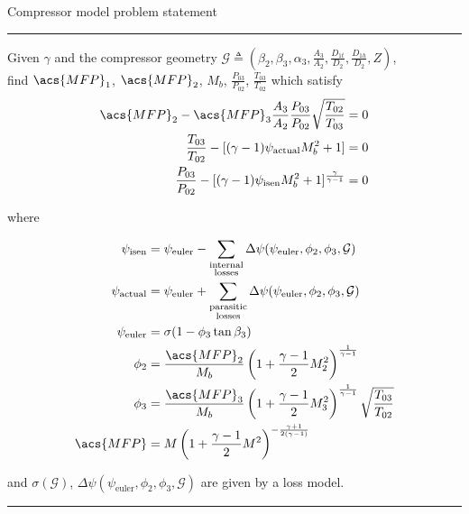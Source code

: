 \documentclass[tcc]{subfiles}
\begin{document}
\begin{table}
\centering
    \caption{Compressor model problem statement}
\begin{minipage}{0.7\textwidth}
    \hrule

    Given $\gamma$ and the compressor geometry 
    $\mathcal{G} \triangleq \left(
    \beta_2, \beta_3, \alpha_3, \tfrac{A_3}{A_2}, \tfrac{D_{1t}}{D_2}, \tfrac{D_{1h}}{D_2}, Z 
    \right)$, \\
    find $\acs{MFP}_1$, $\acs{MFP}_2$, $M_b$, $\frac{P_{03}}{P_{02}}$, $\frac{T_{03}}{T_{02}}$ 
    which satisfy
\begin{align}
    \acs{MFP}_2 - \acs{MFP}_3\frac{A_3}{A_2}\frac{P_{03}}{P_{02}}\sqrt{\frac{T_{02}}{T_{03}}}    &= 0 \\
    \frac{T_{03}}{T_{02}} - [(\gamma-1)\psi_{\text{actual}} M_b^2 + 1]                           &= 0 \\
    \frac{P_{03}}{P_{02}} - [(\gamma-1)\psi_{\text{isen}} M_b^2 + 1]^{\frac{\gamma}{\gamma-1}} &= 0 
\end{align}

where

\begin{align}
    \psi_{\text{isen}}   &= \psi_{\text{euler}}  - \sum_{\substack{\text{internal}\\\text{losses}}} \Delta \psi( \psi_{\text{euler}}, \phi_2, \phi_3, \mathcal{G})\\ 
    \psi_{\text{actual}}   &= \psi_{\text{euler}}  + \sum_{\substack{\text{parasitic}\\\text{losses}}} \Delta \psi( \psi_{\text{euler}}, \phi_2, \phi_3, \mathcal{G}) \\
    \psi_{\text{euler}} & = \sigma(1 - \phi_3 \tan\beta_3) \\
    \phi_2 &= \frac{\acs{MFP}_2}{M_b} \left( 1 + \frac{\gamma-1}{2} M_2^2 \right)^{\frac{1}{\gamma-1}} \\
    \phi_3 &= \frac{\acs{MFP}_3}{M_b} \left( 1 + \frac{\gamma-1}{2} M_3^2 \right)^{\frac{1}{\gamma-1}} \sqrt{\frac{T_{03}}{T_{02}}}\\
    \acs{MFP} &= M \left( 1 + \frac{\gamma-1}{2} M^2 \right)^{-\frac{\gamma+1}{2(\gamma-1)}}
\end{align}

    and 
    $\sigma(\mathcal{G})$, 
    $\Delta \psi( \psi_{\text{euler}}, \phi_2, \phi_3, \mathcal{G})$ 
    are given by a loss model.

    \hrule
\end{minipage}
\end{table}
\end{document}
